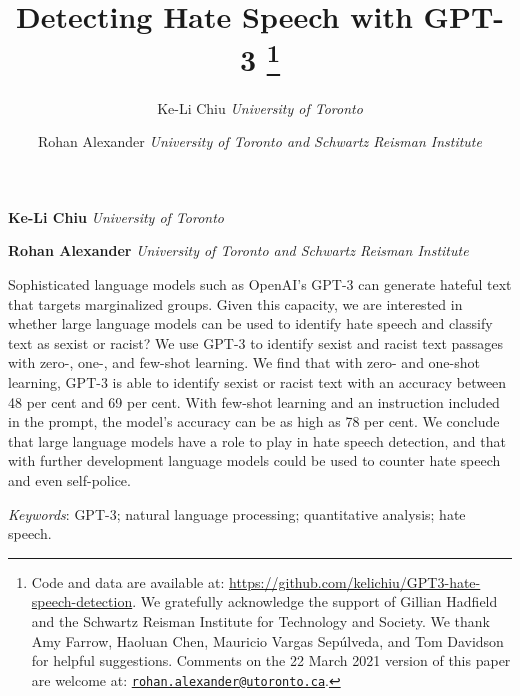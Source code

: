 \documentclass[12pt,]{article}
\title{Detecting Hate Speech with GPT-3 \thanks{Code and data are available at: \url{https://github.com/kelichiu/GPT3-hate-speech-detection}. We gratefully acknowledge the support of Gillian Hadfield and the Schwartz Reisman Institute for Technology and Society. We thank Amy Farrow, Haoluan Chen, Mauricio Vargas Sepúlveda, and Tom Davidson for helpful suggestions. Comments on the 22 March 2021 version of this paper are welcome at: \href{mailto:rohan.alexander@utoronto.ca}{\nolinkurl{rohan.alexander@utoronto.ca}}.}  }
\author{\Large Ke-Li Chiu\vspace{0.05in} \newline\normalsize\emph{University of Toronto}   \and \Large Rohan Alexander\vspace{0.05in} \newline\normalsize\emph{University of Toronto and Schwartz Reisman Institute}  }
\date{}
\newcommand*{\authorfont}{\fontfamily{phv}\selectfont}
\renewenvironment{abstract}
 {{%
    \setlength{\leftmargin}{0mm}
    \setlength{\rightmargin}{\leftmargin}%
  }%
  \relax}
 {\endlist}
\begin{document}
	
%    


{%
\setlength{\parindent}{0pt}
\thispagestyle{plain}
{\fontsize{18}{20}\selectfont\raggedright 
\maketitle  %

}

{
   \vskip 13.5pt\relax \normalsize\fontsize{11}{12} 
\textbf{\authorfont Ke-Li Chiu} \hskip 15pt \emph{\small University of Toronto}   \par \textbf{\authorfont Rohan Alexander} \hskip 15pt \emph{\small University of Toronto and Schwartz Reisman Institute}   

}

}








\begin{abstract}

    \hbox{\vrule height .2pt width 39.14pc}

    \vskip 8.5pt %

\noindent Sophisticated language models such as OpenAI's GPT-3 can generate hateful text that targets marginalized groups. Given this capacity, we are interested in whether large language models can be used to identify hate speech and classify text as sexist or racist? We use GPT-3 to identify sexist and racist text passages with zero-, one-, and few-shot learning. We find that with zero- and one-shot learning, GPT-3 is able to identify sexist or racist text with an accuracy between 48 per cent and 69 per cent. With few-shot learning and an instruction included in the prompt, the model's accuracy can be as high as 78 per cent. We conclude that large language models have a role to play in hate speech detection, and that with further development language models could be used to counter hate speech and even self-police.


\vskip 8.5pt \noindent \emph{Keywords}: GPT-3; natural language processing; quantitative analysis; hate speech. \par

    \hbox{\vrule height .2pt width 39.14pc}



\end{abstract}
\end{document}
